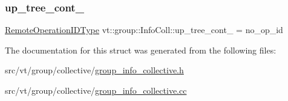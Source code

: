 \subsubsection{\texorpdfstring{up\+\_\+tree\+\_\+cont\+\_\+}{up\_tree\_cont\_}}
{\footnotesize\ttfamily \hyperlink{namespacevt_1_1group_a73f2624ddeb535b39a08b6524f26b244}{Remote\+Operation\+I\+D\+Type} vt\+::group\+::\+Info\+Coll\+::up\+\_\+tree\+\_\+cont\+\_\+ = no\+\_\+op\+\_\+id\hspace{0.3cm}{\ttfamily [private]}}



The documentation for this struct was generated from the following files\+:\begin{DoxyCompactItemize}
\item 
src/vt/group/collective/\hyperlink{group__info__collective_8h}{group\+\_\+info\+\_\+collective.\+h}\item 
src/vt/group/collective/\hyperlink{group__info__collective_8cc}{group\+\_\+info\+\_\+collective.\+cc}\end{DoxyCompactItemize}
